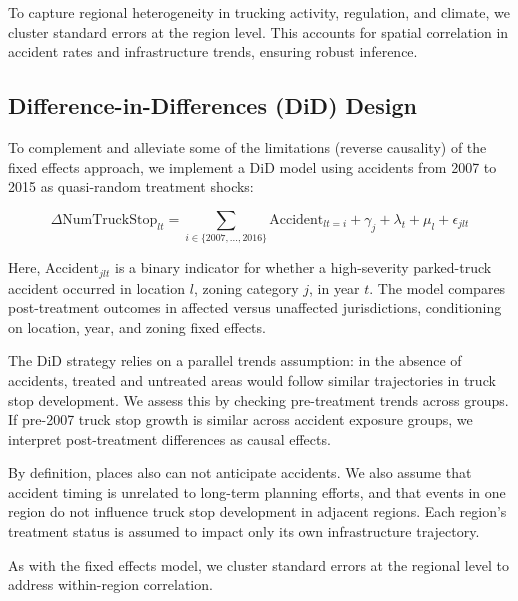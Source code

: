 \documentclass[
  12pt]{article}
\begin{document}
To capture regional heterogeneity in trucking activity, regulation, and
climate, we cluster standard errors at the region level. This accounts
for spatial correlation in accident rates and infrastructure trends,
ensuring robust inference.

\subsection{Difference-in-Differences (DiD)
Design}\label{difference-in-differences-did-design}

To complement and alleviate some of the limitations (reverse causality)
of the fixed effects approach, we implement a DiD model using accidents
from 2007 to 2015 as quasi-random treatment shocks:

\[
\Delta \text{NumTruckStop}_{lt} = \sum_{i \in \{2007, ..., 2016\}} \text{Accident}_{lt=i} + \gamma_j + \lambda_t + \mu_l + \epsilon_{jlt}
\]

Here, \(\text{Accident}_{jlt}\) is a binary indicator for whether a
high-severity parked-truck accident occurred in location \(l\), zoning
category \(j\), in year \(t\). The model compares post-treatment
outcomes in affected versus unaffected jurisdictions, conditioning on
location, year, and zoning fixed effects.

The DiD strategy relies on a parallel trends assumption: in the absence
of accidents, treated and untreated areas would follow similar
trajectories in truck stop development. We assess this by checking
pre-treatment trends across groups. If pre-2007 truck stop growth is
similar across accident exposure groups, we interpret post-treatment
differences as causal effects.

By definition, places also can not anticipate accidents. We also assume
that accident timing is unrelated to long-term planning efforts, and
that events in one region do not influence truck stop development in
adjacent regions. Each region's treatment status is assumed to impact
only its own infrastructure trajectory.

As with the fixed effects model, we cluster standard errors at the
regional level to address within-region correlation.
\end{document}
